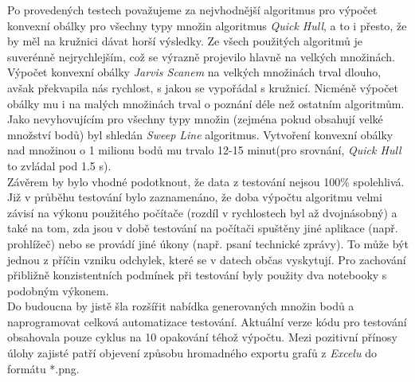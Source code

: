 \documentclass[a4paper, 12pt]{article}
\begin{document}
Po provedených testech považujeme za nejvhodnější algoritmus pro výpočet konvexní obálky pro všechny typy množin algoritmus \textit{Quick Hull}, a to i přesto, že by měl na kružnici dávat horší výsledky. Ze všech použitých algoritmů je suverénně nejrychlejším, což se výrazně projevilo hlavně na velkých množinách. Výpočet konvexní obálky \textit{Jarvis Scanem} na velkých množinách trval dlouho, avšak překvapila nás rychlost, s jakou se vypořádal s kružnicí. Nicméně výpočet obálky mu i na malých množinách trval o poznání déle než ostatním algoritmům. Jako nevyhovujícím pro všechny typy množin (zejména pokud obsahují velké množství bodů) byl shledán \textit{Sweep Line} algoritmus. Vytvoření konvexní obálky nad množinou o 1 milionu bodů mu trvalo 12-15 minut(pro srovnání, \textit{Quick Hull} to zvládal pod 1.5 s).\\

Závěrem by bylo vhodné podotknout, že data z testování nejsou 100\% spolehlivá. Již v průběhu testování bylo zaznamenáno, že doba výpočtu algoritmu velmi závisí na výkonu použitého počítače (rozdíl v rychlostech byl až dvojnásobný) a také na tom, zda jsou v době testování na počítači spuštěny jiné aplikace (např. prohlížeč) nebo se provádí jiné úkony (např. psaní technické zprávy). To může být jednou z příčin vzniku odchylek, které se v datech občas vyskytují. Pro zachování přibližně konzistentních podmínek při testování byly použity dva notebooky s podobným výkonem.\\

Do budoucna by jistě šla rozšířit nabídka generovaných množin bodů a naprogramovat celková automatizace testování. Aktuální verze kódu pro testování obsahovala pouze cyklus na 10 opakování téhož výpočtu. Mezi pozitivní přínosy úlohy zajisté patří objevení způsobu hromadného exportu grafů z \textit{Excelu} do formátu *.png.

\clearpage
\end{document}

